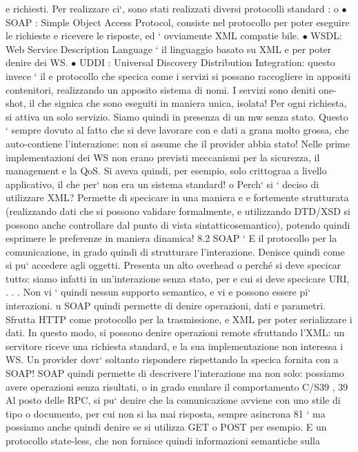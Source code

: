 \documentclass[a4paper,12pt]{article}
\begin{document}
e
richiesti. Per realizzare ci`, sono stati realizzati diversi protocolli standard :
o
$\bullet$ SOAP : Simple Object Access Protocol, consiste nel protocollo per poter
eseguire le richieste e ricevere le risposte, ed ` ovviamente XML compatie
bile.
$\bullet$ WSDL: Web Service Description Language ` il linguaggio basato su XML
e
per poter denire dei WS.
$\bullet$ UDDI : Universal Discovery Distribution Integration: questo invece ` il
e
protocollo che specica come i servizi si possano raccogliere in appositi
contenitori, realizzando un apposito sistema di nomi.
I servizi sono deniti one-shot, il che signica che sono eseguiti in maniera unica,
isolata! Per ogni richiesta, si attiva un solo servizio. Siamo quindi in presenza
di un mw senza stato. Questo ` sempre dovuto al fatto che si deve lavorare con
e
dati a grana molto grossa, che auto-contiene l'interazione: non si assume che il
provider abbia stato!
Nelle prime implementazioni dei WS non erano previsti meccanismi per la
sicurezza, il management e la QoS. Si aveva quindi, per esempio, solo crittograa
a livello applicativo, il che per` non era un sistema standard!
o
Perch` si ` deciso di utilizzare XML? Permette di specicare in una maniera
e e
fortemente strutturata (realizzando dati che si possono validare formalmente, e
utilizzando DTD/XSD si possono anche controllare dal punto di vista sintatticosemantico), potendo quindi esprimere le
preferenze in maniera dinamica!
8.2
SOAP
`
E il protocollo per la comunicazione, in grado quindi di strutturare l'interazione.
Denisce quindi come si pu` accedere agli oggetti. Presenta un alto overhead
o
perché si deve specicar tutto: siamo infatti in un'interazione senza stato, per
e
cui si deve specicare URI, . . . Non vi ` quindi nessun supporto semantico, e vi
e
possono essere pi` interazioni.
u
SOAP quindi permette di denire operazioni, dati e parametri. Sfrutta
HTTP come protocollo per la trasmissione, e XML per poter serializzare i dati.
In questo modo, si possono denire operazioni remote sfruttando l'XML: un
servitore riceve una richiesta standard, e la sua implementazione non interessa i
WS. Un provider dovr` soltanto rispondere rispettando la specica fornita con
a
SOAP!
SOAP quindi permette di descrivere l'interazione ma non solo: possiamo
avere operazioni senza risultati, o in grado emulare il comportamento C/S39 ,
39 Al posto delle RPC, si pu` denire che la comunicazione avviene con uno stile di tipo
o
documento, per cui non si ha mai risposta, sempre asincrona
81
`
ma possiamo anche quindi denire se si utilizza GET o POST per esempio. E
un protocollo state-less, che non fornisce quindi informazioni semantiche sulla
\end{document}
